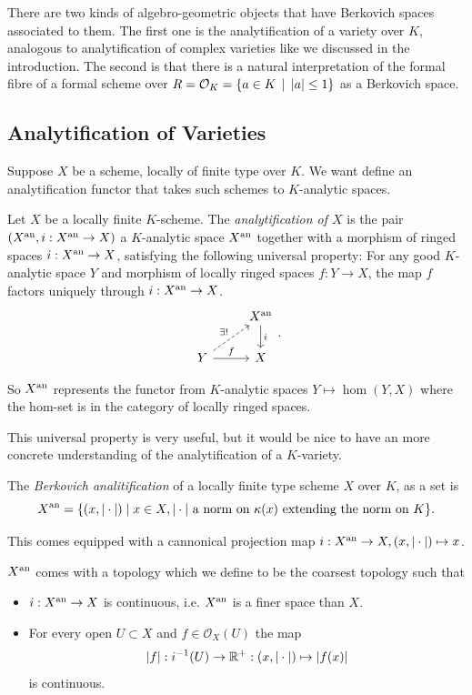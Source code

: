 There are two kinds of algebro-geometric objects that have Berkovich spaces associated to them. 
The first one is the analytification of a variety over $K$, analogous to analytification of complex varieties like we discussed in the introduction. 
The second is that there is a natural interpretation of the formal fibre of a formal scheme over $R = \mathcal{O}_K = \{a \in K \st |a| \le 1\} $ as a Berkovich space. 


\subsection{Analytification of Varieties} \label{sec:analytfication_of_varieties}


Suppose $X$ be a scheme, locally of finite type over $K$.  We want define an analytification functor that takes such schemes to $K$-analytic spaces.  
\begin{definition}
	Let  $X$ be a locally finite $K$-scheme. 
	The \emph{analytification of $X$} is the pair $(X{}^{\text{an}}, i: X{}^{\text{an}} \to X)$ a $K$-analytic space $X{}^{\text{an}}$ together with a morphism of ringed spaces $i: X{}^{\text{an}} \to X$, satisfying the following universal property:
	For any good $K$-analytic space $Y$ and morphism of locally ringed spaces $f: Y \to X$, the map $f$ factors uniquely through $i: X{}^{\text{an}} \to X$. 
	\[
	\begin{tikzcd}
		 & X\an \dar{i} \\
		Y \rar{f} \ar[dashed]{ur}{\exists !} & X
	\end{tikzcd}
	.\] 
\end{definition}
So $X{}^{\text{an}}$ represents the functor from $K$-analytic spaces $Y \mapsto \hom(Y, X)$ where the hom-set is in the category of locally ringed spaces. 

This universal property is very useful, but it would be nice to have an more concrete understanding of the analytification of a $K$-variety. 
\begin{definition}\label{def:berkovich_analytification_explicit}
	The \emph{Berkovich analitification} of a locally finite type scheme $X$ over  $K$, as a set is \[
		X{}^{\text{an}} = \{(x, |\cdot |)  \mid x\in X, |\cdot | \text{ a norm on } \kappa(x) \text{ extending the norm on }K \} 
	.\] 

	This comes equipped with a cannonical projection map $i: X{}^{\text{an}} \to X, (x, |\cdot |) \mapsto  x$.
	
	$X{}^{\text{an}} $ comes with a topology which we define to be the coarsest topology such that 
	\begin{itemize}
		\item $i: X{}^{\text{an}} \to X$ is continuous, i.e. $X{}^{\text{an}}$ is a finer space than  $X$. 
		\item For every open $U \subset X$ and $f \in \mathcal{O}_X(U)$ the map  \[
				|f|: i^{-1}(U) \to \mathbb{R}^{+}: (x, |\cdot |) \mapsto  |f(x)|
		\] 
		is continuous.
	\end{itemize}

\end{definition}

